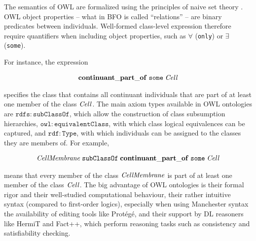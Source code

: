  
The semantics of OWL are formalized using the principles of naive set theory . OWL object properties -- what in BFO is called ``relations'' -- are binary predicates between individuals. %
Well-formed class-level expression therefore require quantifiers when including object properties, such as $\forall$ (\texttt{only}) or $\exists$ (\texttt{some}).


For instance, the expression 

\begin{equation}
\begin{split}
\mathrm{\mathbf{continuant\_part\_of}}\;\mathtt{some}\;\mathit{Cell}
\end{split}
\label{eq:cellquant}
\end{equation}

specifies the class that contains all continuant individuals
that are part of at least one member of the class $\mathit{Cell}$.
The main axiom types available in OWL ontologies are $\mathtt{rdfs:subClassOf}$, which allow the construction of class subsumption hierarchies,
$\mathtt{owl:equivalentClass}$, with which class logical equivalences can be captured, and $\mathtt{rdf:Type}$, with which individuals can be assigned to the classes they are members of.
For example, 

\begin{equation}
\begin{split}
\mathit{CellMembrane}\;\mathtt{subClassOf}\;\mathrm{\mathbf{continuant\_part\_of}}\;\mathtt{some}\;\mathit{Cell}
\end{split}
\label{eq:cellmdef}
\end{equation}

means that every member of the class $\mathit{CellMembrane}$ is
part of at least one member of the class $\mathit{Cell}$.
The big advantage of OWL ontologies is their formal rigor and their well-studied computational behaviour,
their rather intuitive syntax (compared to first-order logics), especially when using Manchester syntax \cite{Man:Syntax} 
the availability of editing tools like Prot\'eg\'e,
and their support by DL reasoners like HermiT and Fact++, which perform
reasoning tasks such as consistency and satisfiability checking.
